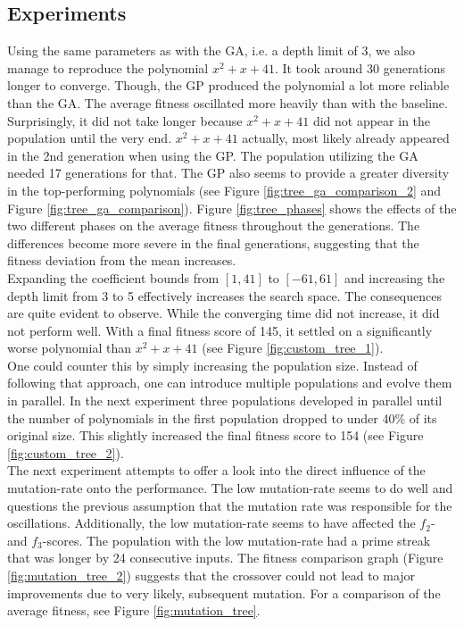 \documentclass[11pt,a4paper]{article}
\begin{document}
\subsection*{Experiments}
Using the same parameters as with the GA, i.e. a depth limit of 3, we also manage to reproduce the polynomial $x^2+x+41$. It took around 30 generations longer to converge. Though, the GP produced the polynomial a lot more reliable than the GA. The average fitness oscillated more heavily than with the baseline. Surprisingly, it did not take longer because $x^2+x+41$ did not appear in the population until the very end. $x^2+x+41$ actually, most likely already appeared in the 2nd generation when using the GP. The population utilizing the GA needed 17 generations for that. The GP also seems to provide a greater diversity in the top-performing polynomials (see Figure \ref{fig:tree_ga_comparison_2} and Figure \ref{fig:tree_ga_comparison}). Figure \ref{fig:tree_phases} shows the effects of the two different phases on the average fitness throughout the generations. The differences become more severe in the final generations, suggesting that the fitness deviation from the mean increases.\\
Expanding the coefficient bounds from $[1, 41]$ to $[-61, 61]$ and increasing the depth limit from 3 to 5 effectively increases the search space. The consequences are quite evident to observe. While the converging time did not increase, it did not perform well. With a final fitness score of 145, it settled on a significantly worse polynomial than $x^2+x+41$ (see Figure \ref{fig:custom_tree_1}). \\
One could counter this by simply increasing the population size. Instead of following that approach, one can introduce multiple populations and evolve them in parallel. In the next experiment three populations developed in parallel until the number of polynomials in the first population dropped to under 40\% of its original size. This slightly increased the final fitness score to 154 (see Figure \ref{fig:custom_tree_2}).
\\
The next experiment attempts to offer a look into the direct influence of the mutation-rate onto the performance. The low mutation-rate seems to do well and questions the previous assumption that the mutation rate was responsible for the oscillations. Additionally, the low mutation-rate seems to have affected the $f_2$- and $f_3$-scores. The population with the low mutation-rate had a prime streak that was longer by 24 consecutive inputs. The fitness comparison graph (Figure \ref{fig:mutation_tree_2}) suggests that the crossover could not lead to major improvements due to very likely, subsequent mutation. For a comparison of the average fitness, see Figure \ref{fig:mutation_tree}. \\
\end{document}
